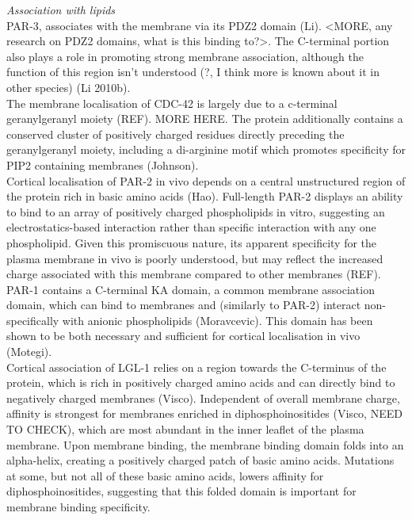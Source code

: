 \documentclass[12pt]{"article"}
\begin{document}
\textit{Association with lipids}\\


PAR-3, associates with the membrane via its PDZ2 domain (Li). <MORE, any research on PDZ2 domains, what is this binding to?>.  The C-terminal portion also plays a role in promoting strong membrane association, although the function of this region isn’t understood (?, I think more is known about it in other species) (Li 2010b). \\

The membrane localisation of CDC-42 is largely due to a c-terminal geranylgeranyl moiety (REF). MORE HERE. The protein additionally contains a conserved cluster of positively charged residues directly preceding the geranylgeranyl moiety, including a di-arginine motif which promotes specificity for PIP2 containing membranes (Johnson).\\

Cortical localisation of PAR-2 in vivo depends on a central unstructured region of the protein rich in basic amino acids (Hao). Full-length PAR-2 displays an ability to bind to an array of positively charged phospholipids in vitro, suggesting an electrostatics-based interaction rather than specific interaction with any one phospholipid. Given this promiscuous nature, its apparent specificity for the plasma membrane in vivo is poorly understood, but may reflect the increased charge associated with this membrane compared to other membranes (REF).\\

PAR-1 contains a C-terminal KA domain, a common membrane association domain, which can bind to membranes and (similarly to PAR-2) interact non-specifically with anionic phospholipids (Moravcevic). This domain has been shown to be both necessary and sufficient for cortical localisation in vivo (Motegi).\\

Cortical association of LGL-1 relies on a region towards the C-terminus of the protein, which is rich in positively charged amino acids and can directly bind to negatively charged membranes (Visco). Independent of overall membrane charge, affinity is strongest for membranes enriched in diphosphoinositides (Visco, NEED TO CHECK), which are most abundant in the inner leaflet of the plasma membrane. Upon membrane binding, the membrane binding domain folds into an alpha-helix, creating a positively charged patch of basic amino acids. Mutations at some, but not all of these basic amino acids, lowers affinity for diphosphoinositides, suggesting that this folded domain is important for membrane binding specificity. \\
\end{document}
